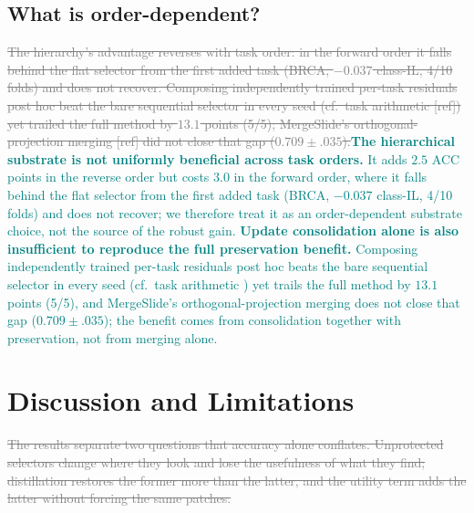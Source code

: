 \documentclass{article}
\newif\ifmarkup \markuptrue
\newcommand{\repc}[3]{\ifmarkup\textcolor{gray}{\sout{#2}}\textcolor{#1}{#3}\else#3\fi}
\newcommand{\repG}[2]{\repc{teal}{#1}{#2}}    %
\begin{document}
\subsection{What is order-dependent?}
\label{ssec:order}

\repG{The hierarchy's advantage reverses with task order: in the forward order it falls behind the flat selector from the first added task (BRCA, $-0.037$ class-IL, 4/10 folds) and does not recover. Composing independently trained per-task residuals post hoc beat the bare sequential selector in every seed (cf.\ task arithmetic [ref]) yet trailed the full method by $13.1$ points (5/5); MergeSlide's orthogonal-projection merging [ref] did not close that gap ($0.709{\pm}.035$).}{\textbf{The hierarchical substrate is not uniformly beneficial across task orders.} It adds $2.5$ ACC points in the reverse order but costs $3.0$ in the forward order, where it falls behind the flat selector from the first added task (BRCA, $-0.037$ class-IL, 4/10 folds) and does not recover; we therefore treat it as an order-dependent substrate choice, not the source of the robust gain. \textbf{Update consolidation alone is also insufficient to reproduce the full preservation benefit.} Composing independently trained per-task residuals post hoc beats the bare sequential selector in every seed (cf.\ task arithmetic \cite{ilharco2023task}) yet trails the full method by $13.1$ points (5/5), and MergeSlide's orthogonal-projection merging \cite{bui2026mergeslide} does not close that gap ($0.709{\pm}.035$); the benefit comes from consolidation together with preservation, not from merging alone.}

\FloatBarrier
\section{Discussion and Limitations}
\label{sec:discussion}

\repG{The results separate two questions that accuracy alone conflates. Unprotected selectors change where they look and lose the usefulness of what they find; distillation restores the former more than the latter, and the utility term adds the latter without forcing the same patches.}{}
\end{document}
